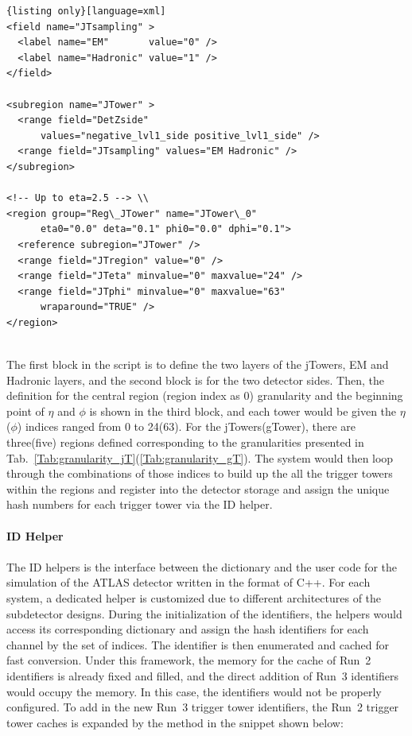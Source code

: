 \begin{lstlisting}{listing only}[language=xml]
<field name="JTsampling" > 
  <label name="EM"       value="0" /> 
  <label name="Hadronic" value="1" /> 
</field> 
	
<subregion name="JTower" > 
  <range field="DetZside"
      values="negative_lvl1_side positive_lvl1_side" /> 
  <range field="JTsampling" values="EM Hadronic" /> 
</subregion> 
	
<!-- Up to eta=2.5 --> \\
<region group="Reg\_JTower" name="JTower\_0" 
      eta0="0.0" deta="0.1" phi0="0.0" dphi="0.1"> 
  <reference subregion="JTower" /> 
  <range field="JTregion" value="0" /> 
  <range field="JTeta" minvalue="0" maxvalue="24" />
  <range field="JTphi" minvalue="0" maxvalue="63" 
      wraparound="TRUE" /> 
</region>
	
\end{lstlisting}
\noindent
The first block in the script is to define the two layers of the jTowers, EM and Hadronic layers, and the second block is for the two detector sides. Then, the definition for the central region (region index as 0) granularity and the beginning point of $\eta$ and $\phi$ is shown in the third block, and each tower would be given the $\eta$($\phi$) indices ranged from 0 to 24(63). For the jTowers(gTower), there are three(five) regions defined corresponding to the granularities presented in Tab.~\ref{Tab:granularity_jT}(\ref{Tab:granularity_gT}). The system would then loop through the combinations of those indices to build up the all the trigger towers within the regions and register into the detector storage and assign the unique hash numbers for each trigger tower via the ID helper. 
\\
\\{\bf ID Helper}
\\
\\The ID helpers is the interface between the dictionary and the user code for the simulation of the ATLAS detector written in the format of C++. For each system, a dedicated helper is customized due to different architectures of the subdetector designs. During the initialization of the identifiers, the helpers would access its corresponding dictionary and assign the hash identifiers for each channel by the set of indices. The identifier is then enumerated and cached for fast conversion. Under this framework, the memory for the cache of Run~2 identifiers is already fixed and filled, and the direct addition of Run~3 identifiers would occupy the memory. In this case, the identifiers would not be properly configured. To add in the new Run~3 trigger tower identifiers, the Run~2 trigger tower caches is expanded by the method in the snippet shown below:
